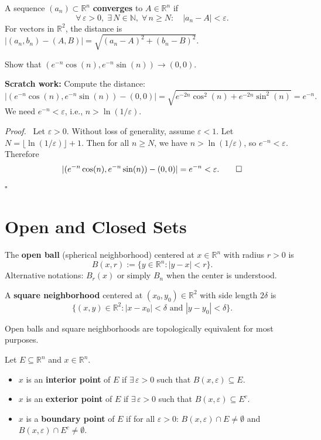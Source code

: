 \documentclass[11pt]{report}
\renewenvironment{proof}[1][Proof]{\par\noindent\textit{#1.}\ }{\hfill$\square$\par\medskip}
\newcommand{\R}{\mathbb{R}}
\newcommand{\N}{\mathbb{N}}
\newcommand{\eps}{\varepsilon}
\begin{document}
\begin{definition}[Convergence of Sequences in $\R^n$]
A sequence $(a_n) \subset \R^n$ \textbf{converges} to $A \in \R^n$ if
\[
\forall\, \eps > 0,\; \exists\, N \in \N,\; \forall\, n \geq N: \quad |a_n - A| < \eps.
\]
For vectors in $\R^2$, the distance is $|(a_n, b_n) - (A, B)| = \sqrt{(a_n - A)^2 + (b_n - B)^2}$.
\end{definition}

\begin{example}
Show that $(e^{-n}\cos(n), e^{-n}\sin(n)) \to (0, 0)$.

\textbf{Scratch work:} Compute the distance:
\[
|(e^{-n}\cos(n), e^{-n}\sin(n)) - (0, 0)| = \sqrt{e^{-2n}\cos^2(n) + e^{-2n}\sin^2(n)} = e^{-n}.
\]
We need $e^{-n} < \eps$, i.e., $n > \ln(1/\eps)$.
\end{example}

\begin{proof}
Let $\eps > 0$. Without loss of generality, assume $\eps < 1$. Let $N = \lfloor \ln(1/\eps) \rfloor + 1$. Then for all $n \geq N$, we have $n > \ln(1/\eps)$, so $e^{-n} < \eps$. Therefore
\[
|(e^{-n}\cos(n), e^{-n}\sin(n)) - (0, 0)| = e^{-n} < \eps. \qedhere
\]
\end{proof}

\section{Open and Closed Sets}

\begin{definition}
The \textbf{open ball} (spherical neighborhood) centered at $x \in \R^n$ with radius $r > 0$ is
\[
B(x, r) := \{y \in \R^n : |y - x| < r\}.
\]
Alternative notations: $B_r(x)$ or simply $B_n$ when the center is understood.
\end{definition}

\begin{definition}
A \textbf{square neighborhood} centered at $(x_0, y_0) \in \R^2$ with side length $2\delta$ is
\[
\{(x, y) \in \R^2 : |x - x_0| < \delta \text{ and } |y - y_0| < \delta\}.
\]
\end{definition}

\begin{remark}
Open balls and square neighborhoods are topologically equivalent for most purposes.
\end{remark}

\begin{definition}
Let $E \subseteq \R^n$ and $x \in \R^n$.
\begin{itemize}[itemsep=4pt]
    \item $x$ is an \textbf{interior point} of $E$ if $\exists\, \eps > 0$ such that $B(x, \eps) \subseteq E$.
    \item $x$ is an \textbf{exterior point} of $E$ if $\exists\, \eps > 0$ such that $B(x, \eps) \subseteq E^c$.
    \item $x$ is a \textbf{boundary point} of $E$ if for all $\eps > 0$: $B(x, \eps) \cap E \neq \emptyset$ and $B(x, \eps) \cap E^c \neq \emptyset$.
\end{itemize}
\end{definition}
\end{document}
